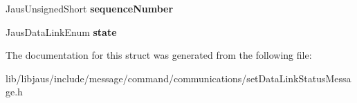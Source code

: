 \begin{DoxyCompactItemize}
\item 
\hypertarget{struct_set_data_link_status_message_struct_a0df32c18f6516918539ad1fda586a68f}{\-Jaus\-Unsigned\-Short {\bfseries sequence\-Number}}\label{struct_set_data_link_status_message_struct_a0df32c18f6516918539ad1fda586a68f}

\item 
\hypertarget{struct_set_data_link_status_message_struct_aea33f5bb2e739d437cf4819c3a004a0f}{\-Jaus\-Data\-Link\-Enum {\bfseries state}}\label{struct_set_data_link_status_message_struct_aea33f5bb2e739d437cf4819c3a004a0f}

\end{DoxyCompactItemize}


\-The documentation for this struct was generated from the following file\-:\begin{DoxyCompactItemize}
\item 
lib/libjaus/include/message/command/communications/set\-Data\-Link\-Status\-Message.\-h\end{DoxyCompactItemize}
